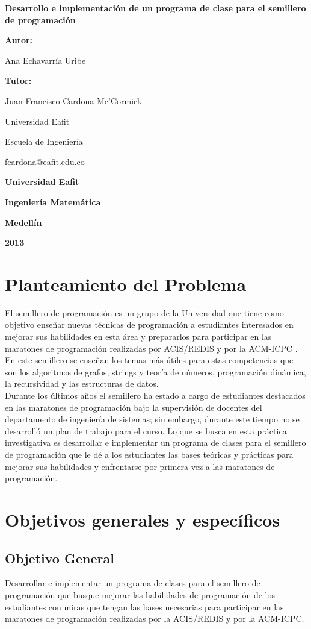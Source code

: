 \documentclass[11pt, oneside]{article}
\makeatletter
\theoremstyle{definition}
\theoremstyle{remark}
\newcommand\portada{
\begin{titlepage}
		\begin{center}
			{\large \bf Desarrollo e implementación de un programa de clase para el semillero de programación }
			\vfill
			{\large\bf Autor: \par}
			{\large Ana Echavarría Uribe\par}
			{\large\bf Tutor: \par}
			{\large Juan Francisco Cardona Mc'Cormick \par Universidad Eafit \par Escuela de Ingeniería \par fcardona@eafit.edu.co }
			\vfill
			{\large\bf Universidad Eafit  \par}
			{\large\bf Ingeniería Matemática \par}
			{\large\bf Medellín\par}
			{\large\bf 2013 \par}
		\end{center}
\end{titlepage}
}
\makeatother
\begin{document}
\portada


\renewcommand\contentsname{\centering Tabla de Contenidos}
\tableofcontents
\clearpage

\section{Planteamiento del Problema}
El semillero de programación es un grupo de la Universidad que tiene como objetivo enseñar nuevas técnicas de programación a estudiantes interesados en mejorar sus habilidades en esta área y prepararlos para participar en las maratones de programación realizadas por ACIS/REDIS \cite{ACIS} y por la ACM-ICPC \cite{ICPC}. En este semillero se enseñan los temas más útiles \cite{ProgrammingChallenges, Halim, Halim2, Brasil} para estas competencias que son los algoritmos de grafos, strings y teoría de números, programación dinámica, la recursividad y las estructuras de datos.\\
Durante los últimos años el semillero ha estado a cargo de estudiantes destacados en las maratones de programación bajo la supervisión de docentes del departamento de ingeniería de sistemas; sin embargo, durante este tiempo no se desarrolló un plan de trabajo para el curso. Lo que se busca en esta práctica investigativa es desarrollar e implementar un programa de clases para el semillero de programación que le dé a los estudiantes las bases teóricas y prácticas para mejorar sus habilidades y enfrentarse por primera vez a las maratones de programación.

\section{Objetivos generales y específicos}

\subsection{Objetivo General}
Desarrollar e implementar un programa de clases para el semillero de programación que busque mejorar las habilidades de programación de los estudiantes con miras que tengan las bases necesarias para participar en las maratones de programación realizadas por la ACIS/REDIS y por la ACM-ICPC.
\end{document}

